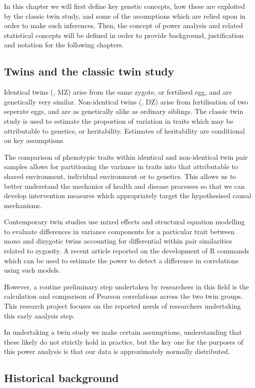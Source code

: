 In this chapter we will first define key genetic concepts, how these are exploited by the classic twin study, and some of the assumptions which are relied upon in order to make such inferences.  Then, the concept of power analysis and related statistical concepts will be defined in order to provide background, justification and notation for the following chapters. 
 
\subsection{Twins and the classic twin study}
Identical twins (\mz, MZ) arise from the same zygote, or fertilised egg, and are genetically very similar.  Non-identical twins (\dz, DZ) arise from fertilisation of two seperate eggs, and are as genetically alike as ordinary siblings. The classic twin study is used to estimate the proportion of variation in traits which may be attributable to genetics, or heritability.  Estimates of heritability are conditional on key assumptions. 

The comparison of phenotypic traits within identical and non-identical twin pair samples allows for partitioning the variance in traits into that attributable to  shared environment, individual environment or to genetics.  This allows us to better understand the mechanics of health and disease processes so that we can develop intervention measures which appropriately target the hypothesised causal mechanisms.

Contemporary twin studies use mixed effects and structural equation modelling to evaluate differences in variance components for a particular trait between mono and dizygotic twins accounting for differential within pair similarities related to zygosity.  A recent article reported on the development of R commands which can be used to estimate the power to detect a difference in correlations using such models.  

However, a routine preliminary step undertaken by researchers in this field is the calculation and comparison of Pearson correlations across the two twin groups.  This research project focuses on the reported needs of researchers undertaking this early analysis step.

In undertaking a twin study we make certain assumptions, understanding that these likely do not strictly hold in practice, but the key one for the purposes of this power analysis is that our data is approximately normally distributed.

\subsection{Historical background}

